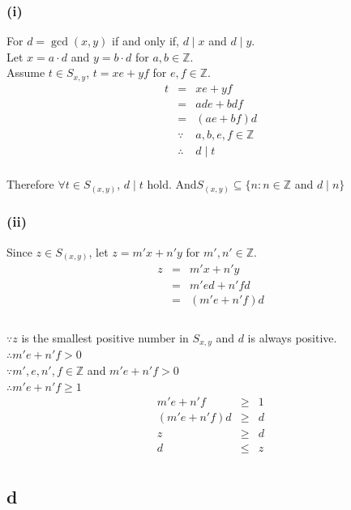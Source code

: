 \documentclass{article} %
\begin{document}
\subsubsection*{(i)}
For $d = \gcd (x,y)$ if and only if, $d\mid x$ and $d\mid y$.\\
Let $x=a\cdot d$ and $y=b\cdot d$ for $a,b\in \mathbb{Z}$.\\
Assume $t\in S_{x,y}$, $t=xe+yf $ for $e,f\in \mathbb{Z}$.\\
\[\begin{array}{rclr}
t&=&xe+yf\\
&=&ade+bdf\\
&=&(ae+bf)d\\
&\because& a,b,e,f\in \mathbb{Z}\\
&\therefore& d\mid t\\
\end{array}\]

Therefore $\forall t\in S_(x,y)$, $d \mid t$ hold. And$S_(x,y)\subseteq \{n:n\in \mathbb{Z}$ and $d\mid n\} $\\
\subsubsection*{(ii)}
Since $z\in S_(x,y)$, let $z=m'x+n'y$ for $m',n'\in \mathbb{Z}$.\\
\[\begin{array}{rclr}
z&=&m'x+n'y\\
&=&m'ed+n'fd\\
&=&(m'e+n'f)d\\
\end{array}\]
\\
$\because z$ is the smallest positive number in $S_{x,y}$ and $d$ is always positive.\\
$\therefore m'e+n'f> 0$\\
$\because m',e,n',f \in \mathbb{Z}$ and $m'e+n'f> 0$\\
$\therefore m'e+n'f\geq 1$\\
\[\begin{array}{rclr}
m'e+n'f&\geq& 1\\
(m'e+n'f)d&\geq& d\\
z&\geq& d\\
d&\leq& z\\
\end{array}\]
\subsection*{d}
\end{document}
